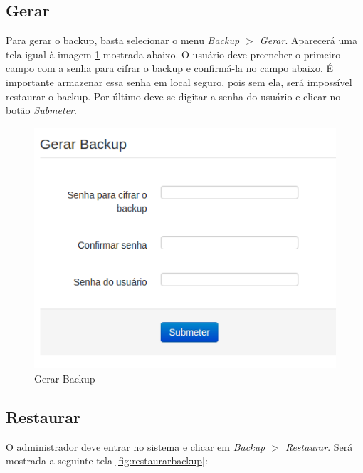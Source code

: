 \subsection{Gerar}

Para gerar o backup, basta selecionar o menu \textit{Backup $>$ Gerar}. Aparecerá uma tela igual à imagem \ref{fig:gerarbackup} mostrada abaixo. O usuário deve preencher o primeiro campo com a senha para cifrar o backup e confirmá-la no campo abaixo. É importante armazenar essa senha em local seguro, pois sem ela, será impossível restaurar o backup.
Por último deve-se digitar a senha do usuário e clicar no botão \emph{Submeter}.

\begin{figure}[ht]
     \centering
     \includegraphics[scale=0.6]{images/gerarbackup.png}
     \caption{Gerar Backup}
     \label{fig:gerarbackup}
\end{figure}

\subsection{Restaurar}

O administrador deve entrar no sistema e clicar em \textit{Backup $>$ Restaurar}. Será mostrada a seguinte tela \ref{fig:restaurarbackup}:


